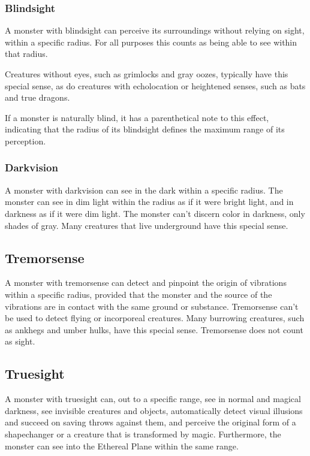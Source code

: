 \subsubsection{Blindsight}

A monster with blindsight can perceive its surroundings without relying on sight, within a specific radius. For all purposes this counts as being able to see within that radius.

Creatures without eyes, such as grimlocks and gray oozes, typically have this special sense, as do creatures with echolocation or heightened senses, such as bats and true dragons.

If a monster is naturally blind, it has a parenthetical note to this effect, indicating that the radius of its blindsight defines the maximum range of its perception.

\subsubsection{Darkvision}

A monster with darkvision can see in the dark within a specific radius. The monster can see in dim light within the radius as if it were bright light, and in darkness as if it were dim light. The monster can't discern color in darkness, only shades of gray. Many creatures that live underground have this special sense.

\subsection{Tremorsense}

A monster with tremorsense can detect and pinpoint the origin of vibrations within a specific radius, provided that the monster and the source of the vibrations are in contact with the same ground or substance. Tremorsense can't be used to detect flying or incorporeal creatures. Many burrowing creatures, such as ankhegs and umber hulks, have this special sense. Tremorsense does not count as sight.

\subsection{Truesight}

A monster with truesight can, out to a specific range, see in normal and magical darkness, see invisible creatures and objects, automatically detect visual illusions and succeed on saving throws against them, and perceive the original form of a shapechanger or a creature that is transformed by magic. Furthermore, the monster can see into the Ethereal Plane within the same range.

